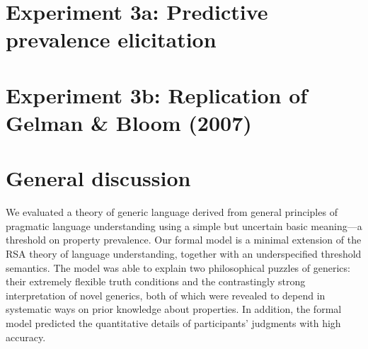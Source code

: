 \documentclass[12pt,letterpaper]{article}
\begin{document}
\section*{Experiment 3a: Predictive prevalence elicitation}

\section*{Experiment 3b: Replication of Gelman \& Bloom (2007)}


\section*{General discussion}

We evaluated a theory of generic language derived from general principles of pragmatic language understanding using a simple but uncertain basic meaning---a threshold on property prevalence.
Our formal model is a minimal extension of the RSA theory of language understanding, together with an underspecified threshold semantics.
The model was able to explain two philosophical puzzles of generics: their extremely flexible truth conditions and the contrastingly strong interpretation of novel generics, both of which were revealed to depend in systematic ways on prior knowledge about properties. In addition, the formal model predicted the quantitative details of participants' judgments with high accuracy.




\end{document}
